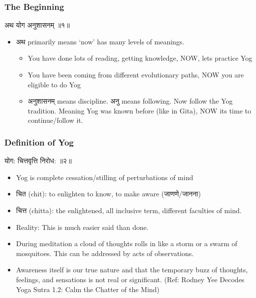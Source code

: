 \begin{frame}[fragile]\frametitle{The Beginning}

\begin{sanskrit}
अथ योग अनुशासनम् ॥१॥
\end{sanskrit}


	\begin{itemize}
	\item अथ primarily means `now' has many levels of meanings.
		\begin{itemize}
		\item You have done lots of reading, getting knowledge, NOW, lets practice Yog
		\item You have been coming from different evolutionary paths, NOW you are eligible to do Yog
		\item अनुशासनम् means discipline. अनु means following. Now follow the Yog tradition. Meaning Yog was known before (like in Gita), NOW its time to continue/follow it.
		\end{itemize}	
	\end{itemize}

\end{frame}


\begin{frame}[fragile]\frametitle{Definition of Yog}

\begin{sanskrit}
योग: चित्तवृत्ति निरोध:  ॥२॥
\end{sanskrit}


	\begin{itemize}
	\item Yog is complete cessation/stilling of perturbations of mind
	\item चित (chit): to enlighten to know, to make aware (जाणणे/जानना)
	\item चित्त (chitta): the enlightened, all inclusive term, different faculties of mind.
	\item Reality: This is much easier said than done. 
	\item During meditation a cloud of thoughts rolls in like a storm or a swarm of mosquitoes. This can be addressed by acts of observations. \item Awareness itself is our true nature and that the temporary buzz of thoughts, feelings, and sensations is not real or significant. ({\tiny Ref: Rodney Yee Decodes Yoga Sutra 1.2: Calm the Chatter of the Mind})
	\end{itemize}

\end{frame}


